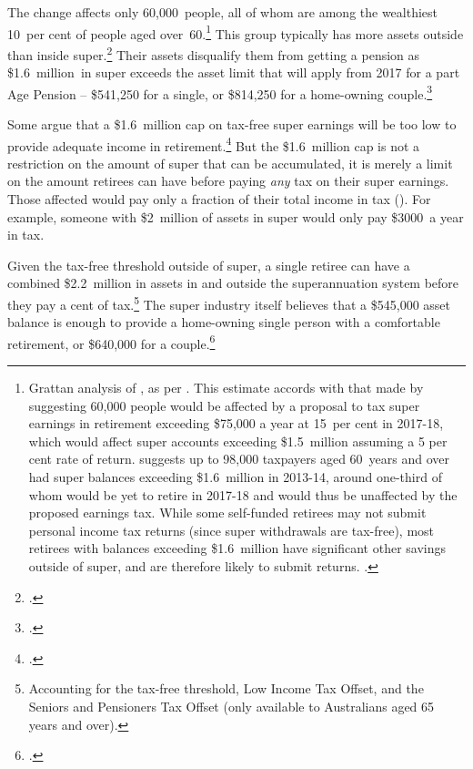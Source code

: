 \documentclass[continuous]{grattan}\usepackage[]{graphicx}\usepackage[]{color}
\begin{document}
The change affects only 60,000~people, all of whom are among the wealthiest 10~per cent of people aged over~60.\footnote{\label{footnote:n-affected-earnings-tax-in-retirement}%
  Grattan analysis of \textcite{ABS-SIH11-CURF}, as per . %
  This estimate accords with that made by \textcite{PBO-2015-Leyonhjelm-super-costing} suggesting 60,000 people would be affected by a proposal to tax super earnings in retirement exceeding \$75,000 a year at 15~per cent in 2017-18, which would affect super accounts exceeding \$1.5~million assuming a 5 per cent rate of return. 
  \textcite{ATO2016SampleFile1314} suggests up to 98,000 taxpayers aged 60~years and over had super balances exceeding \$1.6~million in 2013-14, 
  around one-third of whom would be yet to retire in 2017-18 and would thus be unaffected by the proposed earnings tax. 
  While some self-funded retirees may not submit personal income tax returns (since super withdrawals are tax-free), most retirees with balances exceeding \$1.6~million have significant other savings outside of super, and are therefore likely to submit returns. \textcite[][28]{DaleyCoatesWoodEtAl2015Super}.%
}   This group typically has more assets outside than inside super.\footcite[][28]{DaleyCoatesWoodEtAl2015Super}  
Their assets disqualify them from getting a pension as \$1.6~million~in super exceeds the asset limit that will apply from 2017 for a part Age Pension -- \$541,250 for a single, or \$814,250 for a home-owning couple.\footcite{DHS-2016-Asset-test}

Some argue that a \$1.6~million cap on tax-free super earnings will be too low to provide adequate income in retirement.\footcite{McCrann-scott-morrison-super-changes-big-positive-deal}  
But the \$1.6~million cap is not a restriction on the amount of super that can be accumulated, it is merely a limit on the amount retirees can have before paying \emph{any} tax on their super earnings. %
Those affected would pay only a fraction of their total income in tax (). 
For example, someone with \$2~million of assets in super would only pay \$3000~a year in tax. 

Given the tax-free threshold outside of super, a single retiree can have a combined \$2.2~million in assets in and outside the superannuation system before they pay a cent of tax.\footnote{Accounting for the tax-free threshold, Low Income Tax Offset, and the Seniors and Pensioners Tax Offset (only available to Australians aged 65 years and over).}  
The super industry itself believes that a \$545,000 asset balance is enough to provide a home-owning single person with a comfortable retirement, or \$640,000 for a couple.\footcite{ASFA2015} 
\end{document}
